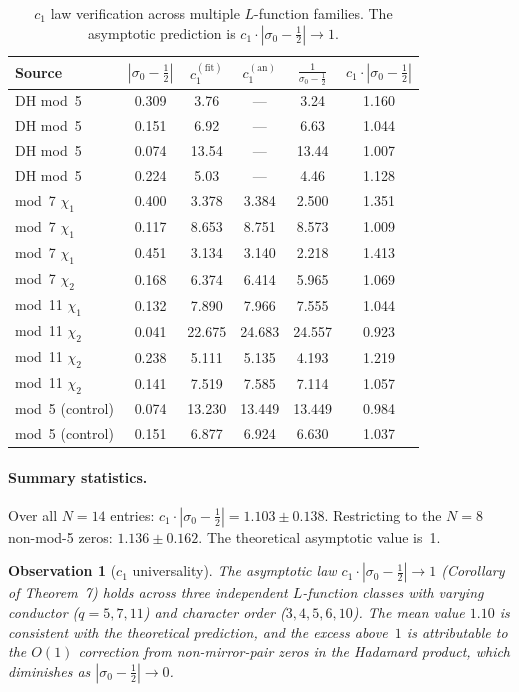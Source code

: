 \documentclass[11pt, a4paper]{article}
\theoremstyle{plain}
\newtheorem{observation}[theorem]{Observation}
\theoremstyle{definition}
\newcommand{\abs}[1]{\left|#1\right|}
\begin{document}
\begin{table}[ht]
\centering
\caption{$c_{1}$ law verification across multiple $L$-function families.
  The asymptotic prediction is $c_{1}\cdot\abs{\sigma_{0}-\frac{1}{2}} \to 1$.}
\label{tab:c1-comparison}
\begin{tabular}{@{}lccccc@{}}
\toprule
\textbf{Source} & $\abs{\sigma_{0}-\tfrac{1}{2}}$
  & $c_{1}^{(\mathrm{fit})}$ & $c_{1}^{(\mathrm{an})}$
  & $\frac{1}{\sigma_{0}-\frac{1}{2}}$
  & $c_{1}\!\cdot\!\abs{\sigma_{0}\!-\!\tfrac{1}{2}}$ \\
\midrule
DH mod~5 & 0.309 & 3.76 & --- & 3.24 & 1.160 \\
DH mod~5 & 0.151 & 6.92 & --- & 6.63 & 1.044 \\
DH mod~5 & 0.074 & 13.54 & --- & 13.44 & 1.007 \\
DH mod~5 & 0.224 & 5.03 & --- & 4.46 & 1.128 \\
\midrule
mod~7 $\chi_{1}$ & 0.400 & 3.378 & 3.384 & 2.500 & 1.351 \\
mod~7 $\chi_{1}$ & 0.117 & 8.653 & 8.751 & 8.573 & 1.009 \\
mod~7 $\chi_{1}$ & 0.451 & 3.134 & 3.140 & 2.218 & 1.413 \\
mod~7 $\chi_{2}$ & 0.168 & 6.374 & 6.414 & 5.965 & 1.069 \\
mod~11 $\chi_{1}$ & 0.132 & 7.890 & 7.966 & 7.555 & 1.044 \\
mod~11 $\chi_{2}$ & 0.041 & 22.675 & 24.683 & 24.557 & 0.923 \\
mod~11 $\chi_{2}$ & 0.238 & 5.111 & 5.135 & 4.193 & 1.219 \\
mod~11 $\chi_{2}$ & 0.141 & 7.519 & 7.585 & 7.114 & 1.057 \\
\midrule
mod~5 (control) & 0.074 & 13.230 & 13.449 & 13.449 & 0.984 \\
mod~5 (control) & 0.151 & 6.877 & 6.924 & 6.630 & 1.037 \\
\bottomrule
\end{tabular}
\end{table}

\paragraph{Summary statistics.}
Over all $N=14$ entries: $c_{1}\cdot\abs{\sigma_{0}-\tfrac{1}{2}} =
1.103 \pm 0.138$.  Restricting to the $N=8$ non-mod-5 zeros:
$1.136 \pm 0.162$.  The theoretical asymptotic value is~1.

\begin{observation}[$c_{1}$ universality]\label{obs:c1}
The asymptotic law $c_{1}\cdot\abs{\sigma_{0}-\tfrac{1}{2}} \to 1$
\textnormal{(}Corollary of Theorem~7\textnormal{)} holds across three
independent $L$-function classes with varying conductor
\textnormal{(}$q=5,7,11$\textnormal{)} and character order
\textnormal{(}$3,4,5,6,10$\textnormal{)}.  The mean value $1.10$ is
consistent with the theoretical prediction, and the excess above~$1$
is attributable to the $O(1)$ correction from non-mirror-pair zeros
in the Hadamard product, which diminishes as
$\abs{\sigma_{0}-\tfrac{1}{2}} \to 0$.
\end{observation}
\end{document}
